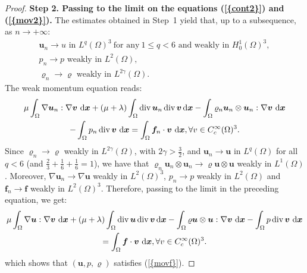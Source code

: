 \documentclass{amsart}
\numberwithin{equation}{section}
\begin{document}
\begin{proof}
\medskip
{\bf Step 2. Passing to the limit on the equations {(\ref{{cont2}})} and {(\ref{{mov2}})}.}
The estimates obtained in Step~1 yield that, up to a subsequence, as ${{n {\rightarrow} + \infty}}$:
\[
\begin{array}{l}\displaystyle
{{\boldsymbol u}}_n {\rightarrow} u \textrm{ in } L^q(\Omega)^3 \ \textrm{for any} \ 1 \le q<6 \textrm{ and weakly in }  H^1_0(\Omega)^3,
\\[1ex] \displaystyle
p_n {\rightarrow} p \textrm{ weakly in } L^2(\Omega),
\\[1ex] \displaystyle
{\varrho}_n {\rightarrow} {\varrho} \textrm{ weakly in } L^{2\gamma}(\Omega).
\end{array}
\]
The weak momentum equation reads: 
\begin{multline*}
\mu \int_\Omega { {{\nabla}} {{\boldsymbol u}}_n} : {{\nabla}} {\bm{v}} \, {\, {\rm d}{{\boldsymbol x}}}+(\mu+\lambda)\int_\Omega \operatorname{div} {{\boldsymbol u}}_n \operatorname{div} {\bm{v}} {\, {\rm d}{{\boldsymbol x}}}  -\int_\Omega {  { {\varrho}_n} {{{\boldsymbol u}}_n} \otimes  {{{\boldsymbol u}}_n} }: {{\nabla}} {\bm{v}} \, {\, {\rm d}{{\boldsymbol x}}}\\ - \int_\Omega  {p_n }\operatorname{div} {\bm{v}} \, {\, {\rm d}{{\boldsymbol x}}}
 =\int_\Omega  {\bm{f}_n }\cdot {\bm{v}} \,{\, {\rm d}{{\boldsymbol x}}}, \forall v \in C^\infty_c(\Omega)^3.
\end{multline*}
Since ${{\varrho}_n {\rightarrow} {\varrho}}$ weakly in $L^{2 \gamma}(\Omega)$, with $2 \gamma > \frac 3 2$, and ${{{\boldsymbol u}}_n {\rightarrow} {{\boldsymbol u}}}$ in $L^q(\Omega)$ for all $q <6$ (and $\frac 2 3 + \frac 1 6 + \frac 1 6=1$), we have that ${{\varrho}_n {{\boldsymbol u}}_n \otimes {{\boldsymbol u}}_n {\rightarrow} {\varrho} {{\boldsymbol u}} \otimes {{\boldsymbol u}}}$ weakly  in $L^1(\Omega)$.
Moreover, $  { {{\nabla}} {{\boldsymbol u}}_n {\rightarrow} {{\nabla}} {{\boldsymbol u}}}$ weakly in $L^2(\Omega)^3$, ${p_n {\rightarrow} p}$ weakly in $L^{2}(\Omega)$
and ${\bm{f}_n {\rightarrow} \bm{f}}$ weakly in $L^{2}(\Omega)^3$.
Therefore, passing to the limit in the preceding equation, we get:
\begin{multline*}
\mu \int_\Omega { {{\nabla}} {{\boldsymbol u}}} : {{\nabla}} {\bm{v}} \, {\, {\rm d}{{\boldsymbol x}}}+(\mu+\lambda)\int_\Omega \operatorname{div} {{\boldsymbol u}} \operatorname{div} {\bm{v}} {\, {\rm d}{{\boldsymbol x}}}  -\int_\Omega {  {\varrho} {{\boldsymbol u}} \otimes  {{\boldsymbol u}} }: {{\nabla}} {\bm{v}} \, {\, {\rm d}{{\boldsymbol x}}}- \int_\Omega  {p }\operatorname{div} {\bm{v}} \, {\, {\rm d}{{\boldsymbol x}}}
 \\ =\int_\Omega  {\bm{f} }\cdot {\bm{v}} \,{\, {\rm d}{{\boldsymbol x}}}, \forall v \in C^\infty_c(\Omega)^3.
\end{multline*}
which shows  that $({{\boldsymbol u}},p,{\varrho})$ satisfies {(\ref{{movf}})}.


\end{proof}
\end{document}
